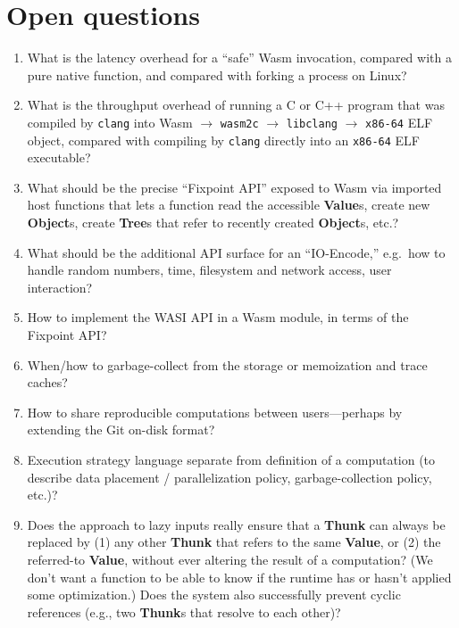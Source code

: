 \documentclass{article}
\newcommand{\valuex}{\textbf{Value}\xspace}
\newcommand{\valuexs}{\textbf{Value}s\xspace}
\newcommand{\objects}{\textbf{Object}s\xspace}
\newcommand{\thunk}{\textbf{Thunk}\xspace}
\newcommand{\thunks}{\textbf{Thunk}s\xspace}
\newcommand{\trees}{\textbf{Tree}s\xspace}
\begin{document}
\section{Open questions}

\begin{enumerate}[itemsep=0pt]
\item What is the latency overhead for a ``safe'' Wasm invocation, compared with a pure native function,
  and compared with forking a process on Linux?

\item What is the throughput overhead of running a C or C++ program
  that was compiled by \texttt{clang} into Wasm $\rightarrow$
  \texttt{wasm2c} $\rightarrow$ \texttt{libclang} $\rightarrow$
  \texttt{x86-64} ELF object, compared with compiling by \texttt{clang}
  directly into an \texttt{x86-64} ELF executable?

\item What should be the precise ``Fixpoint API'' exposed to Wasm via imported host functions that lets a function read the accessible \valuexs, create new \objects,
  create \trees that refer to recently created \objects, etc.?
  
\item What should be the additional API surface for an ``IO-Encode,'' e.g.~how to handle random numbers, time, filesystem and network access, user interaction?

\item How to implement the WASI API in a Wasm module, in terms of the Fixpoint API?
  
\item When/how to garbage-collect from the storage or memoization and trace caches?

\item How to share reproducible computations between users---perhaps by extending the Git on-disk format?
  
\item Execution strategy language separate from definition of a
  computation (to describe data placement / parallelization policy,
  garbage-collection policy, etc.)?
  
\item Does the approach to lazy inputs really ensure that a \thunk can
  always be replaced by (1) any other \thunk that refers to the same
  \valuex, or (2) the referred-to \valuex, without ever altering the
  result of a computation? (We don't want a function to be able to
  know if the runtime has or hasn't applied some optimization.) Does
  the system also successfully prevent cyclic references (e.g., two \thunks that resolve to
  each other)?


\end{enumerate}
\end{document}
